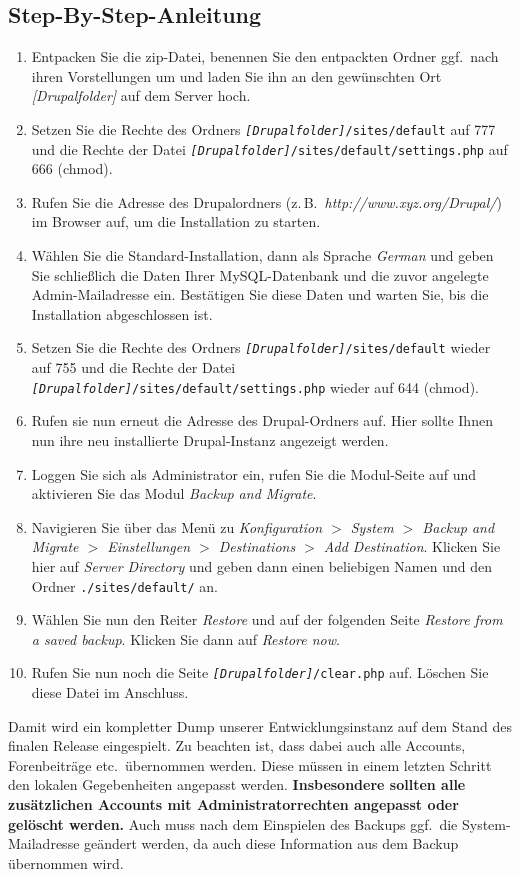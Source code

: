 \documentclass[a4paper,11pt,twoside]{article}
\begin{document}
\subsection{Step-By-Step-Anleitung}
\begin{enumerate}
\item Entpacken Sie die zip-Datei, benennen Sie den entpackten Ordner
  ggf.\ nach ihren Vorstellungen um und laden Sie ihn an den gewünschten Ort
  \textit{[Drupalfolder]} auf dem Server hoch.
\item Setzen Sie die Rechte des Ordners
  \texttt{\textit{[Drupalfolder]}/sites/default} auf 777 und die Rechte der
  Datei \texttt{\textit{[Drupalfolder]}/sites/default/settings.php} auf 666
  (chmod).
\item Rufen Sie die Adresse des Drupalordners
  (z.\,B.\ \textit{http://www.xyz.org/Drupal/}) im Browser auf, um die
  Installation zu starten.
\item Wählen Sie die Standard-Installation, dann als Sprache \emph{German} und
  geben Sie schließlich die Daten Ihrer MySQL-Datenbank und die zuvor
  angelegte Admin-Mailadresse ein. Bestätigen Sie diese Daten und warten Sie,
  bis die Installation abgeschlossen ist.
\item Setzen Sie die Rechte des Ordners
  \texttt{\textit{[Drupalfolder]}/sites/default} wieder auf 755 und die Rechte
  der Datei \texttt{\textit{[Drupalfolder]}/sites/default/settings.php} wieder
  auf 644 (chmod).
\item Rufen sie nun erneut die Adresse des Drupal-Ordners auf. Hier sollte
  Ihnen nun ihre neu installierte Drupal-Instanz angezeigt werden.
\item Loggen Sie sich als Administrator ein, rufen Sie die Modul-Seite auf und
  aktivieren Sie das Modul \emph{Backup and Migrate}.
\item Navigieren Sie über das Menü zu \emph{Konfiguration $>$ System $>$
  Backup and Migrate $>$ Einstellungen $>$ Destinations $>$ Add Destination}.
  Klicken Sie hier auf \emph{Server Directory} und geben dann einen beliebigen
  Namen und den Ordner \texttt{./sites/default/} an.
\item Wählen Sie nun den Reiter \emph{Restore} und auf der folgenden Seite
  \emph{Restore from a saved backup}. Klicken Sie dann auf \emph{Restore now}.
\item Rufen Sie nun noch die Seite \texttt{\textit{[Drupalfolder]}/clear.php}
  auf.  Löschen Sie diese Datei im Anschluss.
\end{enumerate}
Damit wird ein kompletter Dump unserer Entwicklungsinstanz auf dem Stand des
finalen Release eingespielt. Zu beachten ist, dass dabei auch alle Accounts,
Forenbeiträge etc.\ übernommen werden. Diese müssen in einem letzten Schritt
den lokalen Gegebenheiten angepasst werden. \textbf{Insbesondere sollten alle
  zusätzlichen Accounts mit Administratorrechten angepasst oder gelöscht
  werden.} Auch muss nach dem Einspielen des Backups ggf.\ die
System-Mailadresse geändert werden, da auch diese Information aus dem Backup
übernommen wird.
\end{document}
